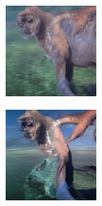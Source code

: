 \documentclass{article}
\begin{document}
\begin{figure}
    \begin{subfigure}[b]{0.5\linewidth}
        \begin{subfigure}[b]{0.242\linewidth}
        \includegraphics[width=\linewidth]{figures/imagenet128/solver_samples/imagenet128_fm_ot_204_05.png}
        \end{subfigure}%
        \begin{subfigure}[b]{0.242\linewidth}
        \includegraphics[width=\linewidth]{figures/imagenet128/solver_samples/imagenet128_fm_ot_204_10.png}

\end{subfigure}
\end{subfigure}
\end{figure}
\end{document}

